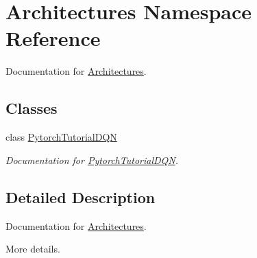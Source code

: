 \hypertarget{namespaceArchitectures}{}\section{Architectures Namespace Reference}
\label{namespaceArchitectures}


Documentation for \mbox{\hyperlink{namespaceArchitectures}{Architectures}}.  


\subsection*{Classes}
\begin{DoxyCompactItemize}
\item 
class \mbox{\hyperlink{classArchitectures_1_1PytorchTutorialDQN}{Pytorch\+Tutorial\+D\+QN}}
\begin{DoxyCompactList}\small\item\em Documentation for \mbox{\hyperlink{classArchitectures_1_1PytorchTutorialDQN}{Pytorch\+Tutorial\+D\+QN}}. \end{DoxyCompactList}\end{DoxyCompactItemize}


\subsection{Detailed Description}
Documentation for \mbox{\hyperlink{namespaceArchitectures}{Architectures}}. 

More details. 